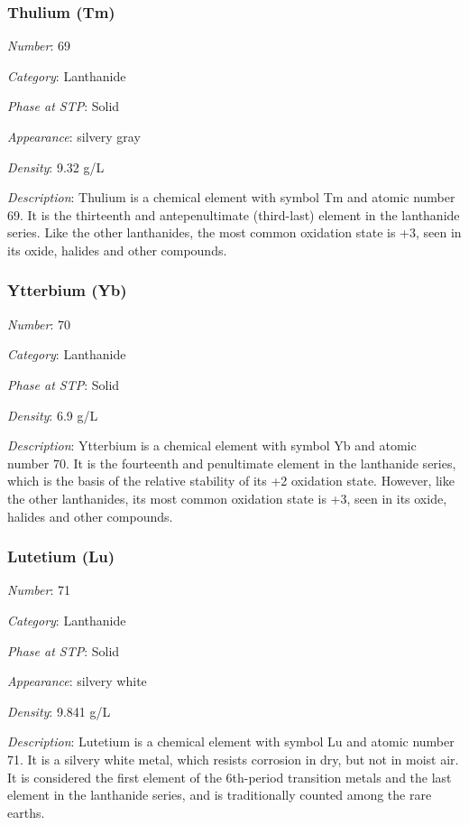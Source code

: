 \documentclass{article}
\begin{document}
\hypertarget{subsubsection::Tm}{}\subsubsection{Thulium (Tm)}

\textit{Number}: 69

\textit{Category}: Lanthanide

\textit{Phase at STP}: Solid

\textit{Appearance}: silvery gray

\textit{Density}: 9.32 g/L

\textit{Description}: Thulium is a chemical element with symbol Tm and atomic number 69. It is the thirteenth and antepenultimate (third-last) element in the lanthanide series. Like the other lanthanides, the most common oxidation state is +3, seen in its oxide, halides and other compounds.

\hypertarget{subsubsection::Yb}{}\subsubsection{Ytterbium (Yb)}

\textit{Number}: 70

\textit{Category}: Lanthanide

\textit{Phase at STP}: Solid

\textit{Density}: 6.9 g/L

\textit{Description}: Ytterbium is a chemical element with symbol Yb and atomic number 70. It is the fourteenth and penultimate element in the lanthanide series, which is the basis of the relative stability of its +2 oxidation state. However, like the other lanthanides, its most common oxidation state is +3, seen in its oxide, halides and other compounds.

\hypertarget{subsubsection::Lu}{}\subsubsection{Lutetium (Lu)}

\textit{Number}: 71

\textit{Category}: Lanthanide

\textit{Phase at STP}: Solid

\textit{Appearance}: silvery white

\textit{Density}: 9.841 g/L

\textit{Description}: Lutetium is a chemical element with symbol Lu and atomic number 71. It is a silvery white metal, which resists corrosion in dry, but not in moist air. It is considered the first element of the 6th-period transition metals and the last element in the lanthanide series, and is traditionally counted among the rare earths.
\end{document}
